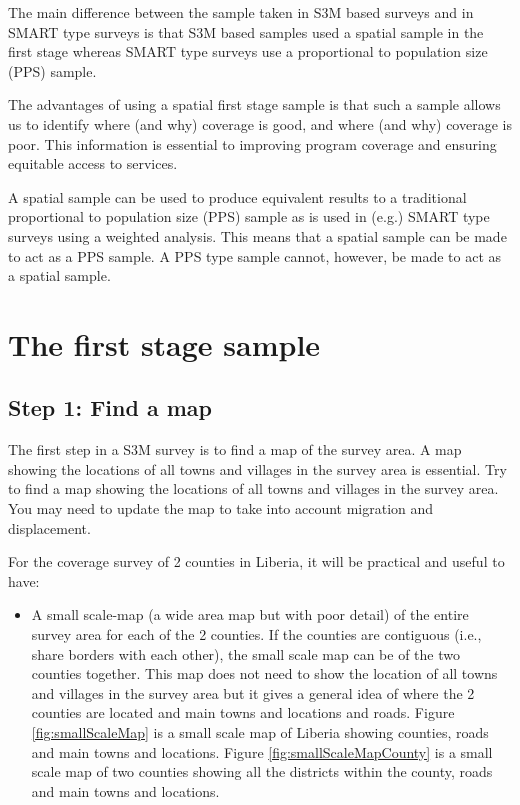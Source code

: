 \documentclass[12pt,a4paper]{book}
\providecommand{\tightlist}{%
  \setlength{\itemsep}{0pt}\setlength{\parskip}{0pt}}
\theoremstyle{definition}
\theoremstyle{definition}
\theoremstyle{definition}
\theoremstyle{remark}
\begin{document}
The main difference between the sample taken in S3M based surveys and in
SMART type surveys is that S3M based samples used a spatial sample in
the first stage whereas SMART type surveys use a proportional to
population size (PPS) sample.

The advantages of using a spatial first stage sample is that such a
sample allows us to identify where (and why) coverage is good, and where
(and why) coverage is poor. This information is essential to improving
program coverage and ensuring equitable access to services.

A spatial sample can be used to produce equivalent results to a
traditional proportional to population size (PPS) sample as is used in
(e.g.) SMART type surveys using a weighted analysis. This means that a
spatial sample can be made to act as a PPS sample. A PPS type sample
cannot, however, be made to act as a spatial sample.

\hypertarget{stage1}{%
\chapter{The first stage sample}\label{stage1}}

\hypertarget{step-1-find-a-map}{%
\section{Step 1: Find a map}\label{step-1-find-a-map}}

The first step in a S3M survey is to find a map of the survey area. A
map showing the locations of all towns and villages in the survey area
is essential. Try to find a map showing the locations of all towns and
villages in the survey area. You may need to update the map to take into
account migration and displacement.

For the coverage survey of 2 counties in Liberia, it will be practical
and useful to have:

\begin{itemize}
\tightlist
\item
  A small scale-map (a wide area map but with poor detail) of the entire
  survey area for each of the 2 counties. If the counties are contiguous
  (i.e., share borders with each other), the small scale map can be of
  the two counties together. This map does not need to show the location
  of all towns and villages in the survey area but it gives a general
  idea of where the 2 counties are located and main towns and locations
  and roads. Figure \ref{fig:smallScaleMap} is a small scale map of
  Liberia showing counties, roads and main towns and locations. Figure
  \ref{fig:smallScaleMapCounty} is a small scale map of two counties
  showing all the districts within the county, roads and main towns and
  locations.
\end{itemize}
\end{document}

